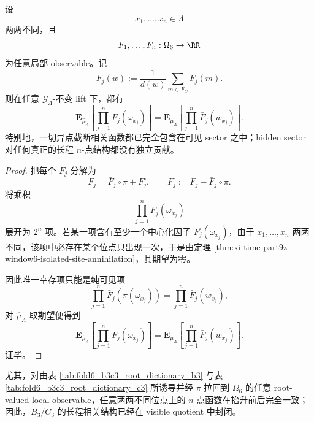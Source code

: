 \begin{theorem}\label{thm:xi-time-part9z-window6-distinct-point-complete-visibility}
设
\[
x_1,\dots,x_n\in \Lambda
\]
两两不同，且
\[
F_1,\dots,F_n:\Omega_6\to\RR
\]
为任意局部 observable。记
\[
\bar F_j(w):=\frac1{d(w)}\sum_{m\in F_w}F_j(m).
\]
则在任意 \(\mathcal G_\Lambda\)-不变 lift 下，都有
\[
\mathbf E_{\widehat\mu_\Lambda}\!\left[\prod_{j=1}^n F_j(\omega_{x_j})\right]
=
\mathbf E_{\mu_\Lambda}\!\left[\prod_{j=1}^n \bar F_j(w_{x_j})\right].
\]
特别地，一切异点截断相关函数都已完全包含在可见 sector 之中；hidden sector 对任何真正的长程 \(n\)-点结构都没有独立贡献。
\end{theorem}
\begin{proof}
把每个 \(F_j\) 分解为
\[
F_j=\bar F_j\circ \pi + F_j^\circ,
\qquad
F_j^\circ:=F_j-\bar F_j\circ\pi.
\]
将乘积
\[
\prod_{j=1}^n F_j(\omega_{x_j})
\]
展开为 \(2^n\) 项。若某一项含有至少一个中心化因子 \(F_j^\circ(\omega_{x_j})\)，由于 \(x_1,\dots,x_n\) 两两不同，该项中必存在某个位点只出现一次，于是由定理 \ref{thm:xi-time-part9z-window6-isolated-site-annihilation}，其期望为零。

因此唯一幸存项只能是纯可见项
\[
\prod_{j=1}^n \bar F_j(\pi(\omega_{x_j}))
=
\prod_{j=1}^n \bar F_j(w_{x_j}),
\]
对 \(\widehat\mu_\Lambda\) 取期望便得到
\[
\mathbf E_{\widehat\mu_\Lambda}\!\left[\prod_{j=1}^n F_j(\omega_{x_j})\right]
=
\mathbf E_{\mu_\Lambda}\!\left[\prod_{j=1}^n \bar F_j(w_{x_j})\right].
\]
证毕。
\end{proof}

\noindent
尤其，对由表 \ref{tab:fold6_b3c3_root_dictionary_b3} 与表 \ref{tab:fold6_b3c3_root_dictionary_c3} 所诱导并经 \(\pi\) 拉回到 \(\Omega_6\) 的任意 root-valued local observable，任意两两不同位点上的 \(n\)-点函数在抬升前后完全一致；因此，\(B_3/C_3\) 的长程相关结构已经在 visible quotient 中封闭。

